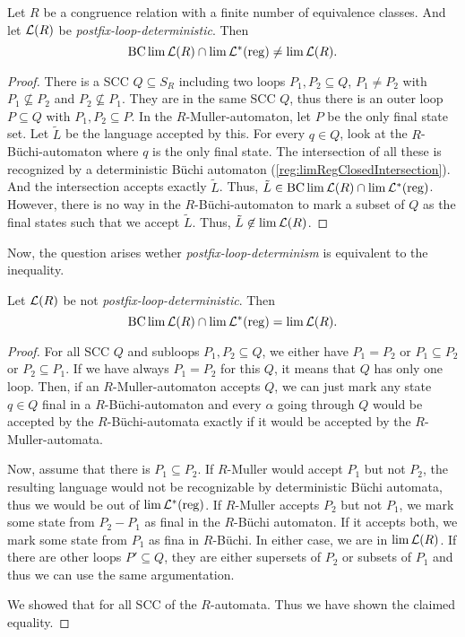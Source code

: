 \begin{lemma}
\label{gen:postfixloopdet->BclimAndLreg=lim}
Let $R$ be a congruence relation with a finite number of equivalence classes. And let $\mathcal{L}(R)$ be \emph{postfix-loop-deterministic}. Then
\[ \operatorname{BC} \lim \mathcal{L}(R) \cap \lim \mathcal{L}^*(\textup{\textrm{reg}}) \neq \lim \mathcal{L}(R) . \]
\begin{proof}
There is a SCC $Q \subseteq S_R$ including two loops $P_1,P_2 \subseteq Q$, $P_1 \neq P_2$ with $P_1 \not\subseteq P_2$ and $P_2 \not\subseteq P_1$. They are in the same SCC $Q$, thus there is an outer loop $P \subseteq Q$ with $P_1,P_2 \subseteq P$. In the $R$-Muller-automaton, let $P$ be the only final state set. Let $\tilde L$ be the language accepted by this. For every $q \in Q$, look at the $R$-Büchi-automaton where $q$ is the only final state. The intersection of all these is recognized by a deterministic Büchi automaton (\cref{reg:limRegClosedIntersection}). And the intersection accepts exactly $\tilde L$. Thus, $\tilde L \in \operatorname{BC} \lim \mathcal{L}(R) \cap \lim \mathcal{L}^*(\textup{\textrm{reg}})$. However, there is no way in the $R$-Büchi-automaton to mark a subset of $Q$ as the final states such that we accept $\tilde L$. Thus, $\tilde L \not\in \lim \mathcal{L}(R)$.
\end{proof}
\end{lemma}

Now, the question arises wether \emph{postfix-loop-determinism} is equivalent to the inequality.
\begin{lemma}
\label{gen:postfixloopdet<-BclimAndLreg=lim}
Let $\mathcal{L}(R)$ be not \emph{postfix-loop-deterministic}. Then
\[ \operatorname{BC} \lim \mathcal{L}(R) \cap \lim \mathcal{L}^*(\textup{\textrm{reg}}) = \lim \mathcal{L}(R) . \]
\begin{proof}
For all SCC $Q$ and subloops $P_1,P_2 \subseteq Q$, we either have $P_1 = P_2$ or $P_1 \subseteq P_2$ or $P_2 \subseteq P_1$. If we have always $P_1 = P_2$ for this $Q$, it means that $Q$ has only one loop. Then, if an $R$-Muller-automaton accepts $Q$, we can just mark any state $q \in Q$ final in a $R$-Büchi-automaton and every $\alpha$ going through $Q$ would be accepted by the $R$-Büchi-automata exactly if it would be accepted by the $R$-Muller-automata. 

Now, assume that there is $P_1 \subseteq P_2$. If $R$-Muller would accept $P_1$ but not $P_2$, the resulting language would not be recognizable by deterministic Büchi automata, thus we would be out of $\lim \mathcal{L}^*(\textup{\textrm{reg}})$. If $R$-Muller accepts $P_2$ but not $P_1$, we mark some state from $P_2 - P_1$ as final in the $R$-Büchi automaton. If it accepts both, we mark some state from $P_1$ as fina in $R$-Büchi. In either case, we are in $\lim \mathcal{L}(R)$. If there are other loops $P' \subseteq Q$, they are either supersets of $P_2$ or subsets of $P_1$ and thus we can use the same argumentation.

We showed that for all SCC of the $R$-automata. Thus we have shown the claimed equality.
\end{proof}
\end{lemma}

